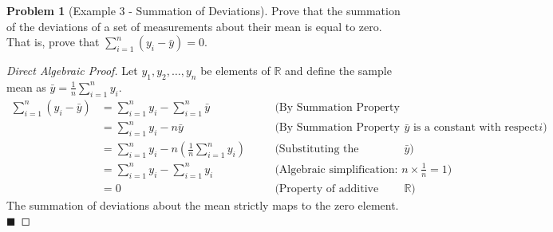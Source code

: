 \documentclass[11pt]{article}
\theoremstyle{definition}
\newtheorem{problem}{Problem}
\theoremstyle{remark}
\newcommand{\R}{\mathbb{R}}
\newcommand{\samplemean}{\bar{y}}
\begin{document}
\begin{problem}[Example 3 - Summation of Deviations]
Prove that the summation of the deviations of a set of measurements about their mean is equal to zero. That is, prove that $\sum_{i=1}^n (y_i - \samplemean) = 0$.
\end{problem}
\begin{proof}[Direct Algebraic Proof]
Let $y_1, y_2, \dots, y_n$ be elements of $\R$ and define the sample mean as $\samplemean = \frac{1}{n}\sum_{i=1}^n y_i$. 
\begin{align*}
    \sum_{i=1}^n (y_i - \samplemean) &= \sum_{i=1}^n y_i - \sum_{i=1}^n \samplemean \quad &&\text{(By Summation Property 3, additive separation)} \\
    &= \sum_{i=1}^n y_i - n\samplemean \quad &&\text{(By Summation Property 1, since $\samplemean$ is a constant with respect to $i$)} \\
    &= \sum_{i=1}^n y_i - n\left(\frac{1}{n}\sum_{i=1}^n y_i\right) \quad &&\text{(Substituting the definition of the sample mean $\samplemean$)} \\
    &= \sum_{i=1}^n y_i - \sum_{i=1}^n y_i \quad &&\text{(Algebraic simplification: $n \times \frac{1}{n} = 1$)} \\
    &= 0 \quad &&\text{(Property of additive inverses in $\R$)}
\end{align*}
The summation of deviations about the mean strictly maps to the zero element. $\blacksquare$
\end{proof}
\end{document}
